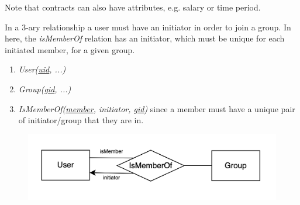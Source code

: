 \documentclass{article}
\begin{document}
\begin{example}
\begin{figure}[H]
          \caption{} 
          \label{fig:four_ary}
        \end{figure}
        Note that contracts can also have attributes, e.g. salary or time period. 
      \end{example}

      \begin{example}
        In a 3-ary relationship a user must have an initiator in order to join a group. In here, the \textit{isMemberOf} relation has an initiator, which must be unique for each initiated member, for a given group. 
        \begin{enumerate}
          \item \textit{User(\underline{uid}, ...)} 
          \item \textit{Group(\underline{gid}, ...)} 
          \item \textit{IsMemberOf(\underline{member}, initiator, \underline{gid})} since a member must have a unique pair of initiator/group that they are in. 
        \end{enumerate}
        \begin{figure}[H]
          \centering 
          \includegraphics[scale=0.3]{img/three_ary.png}
          \caption{} 
          \label{fig:three_ary}
        \end{figure}
      \end{example}
\end{document}
